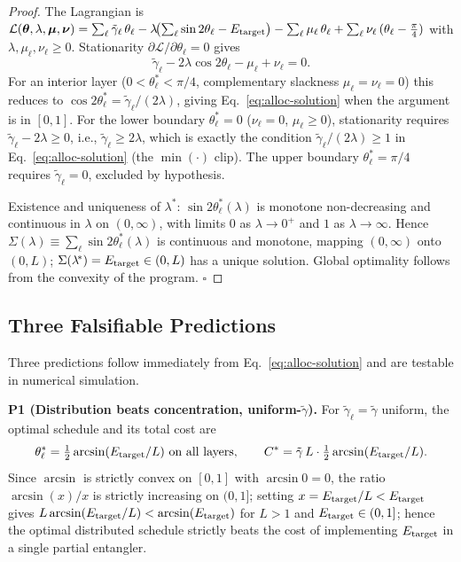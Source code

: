 \begin{proof}
The Lagrangian is
$\mathcal{L}(\boldsymbol\theta,\lambda,\boldsymbol\mu,\boldsymbol\nu)
= \sum_\ell \tilde\gamma_\ell\,\theta_\ell
- \lambda\!\bigl(\sum_\ell \sin 2\theta_\ell - E_{\rm target}\bigr)
- \sum_\ell \mu_\ell\,\theta_\ell
+ \sum_\ell \nu_\ell\,(\theta_\ell - \tfrac{\pi}{4})$
with $\lambda,\mu_\ell,\nu_\ell \geq 0$.
Stationarity $\partial\mathcal{L}/\partial\theta_\ell = 0$ gives
%
\begin{equation*}
\tilde\gamma_\ell - 2\lambda \cos 2\theta_\ell - \mu_\ell + \nu_\ell = 0.
\end{equation*}
%
For an interior layer ($0 < \theta_\ell^* < \pi/4$, complementary
slackness $\mu_\ell = \nu_\ell = 0$) this reduces to
$\cos 2\theta_\ell^* = \tilde\gamma_\ell/(2\lambda)$,
giving Eq.~\eqref{eq:alloc-solution} when the argument is in $[0,1]$.
For the lower boundary $\theta_\ell^* = 0$ ($\nu_\ell = 0$,
$\mu_\ell \geq 0$), stationarity requires
$\tilde\gamma_\ell - 2\lambda \geq 0$, i.e., $\tilde\gamma_\ell \geq 2\lambda$,
which is exactly the condition $\tilde\gamma_\ell/(2\lambda) \geq 1$
in Eq.~\eqref{eq:alloc-solution} (the $\min(\cdot)$ clip).
The upper boundary $\theta_\ell^* = \pi/4$ requires $\tilde\gamma_\ell = 0$,
excluded by hypothesis.

Existence and uniqueness of $\lambda^{\!*}$:
$\sin 2\theta_\ell^*(\lambda)$ is monotone non-decreasing and
continuous in $\lambda$ on $(0,\infty)$, with limits $0$ as $\lambda\to 0^+$
and $1$ as $\lambda\to\infty$.
Hence $\Sigma(\lambda) \equiv \sum_\ell \sin 2\theta_\ell^*(\lambda)$
is continuous and monotone, mapping $(0,\infty)$ onto $(0, L)$;
$\Sigma(\lambda^{\!*}) = E_{\rm target} \in (0,L)$ has a unique
solution.
Global optimality follows from the convexity of the program. $\square$
\end{proof}

\subsection{Three Falsifiable Predictions}
\label{subsec:predictions}

Three predictions follow immediately from Eq.~\eqref{eq:alloc-solution}
and are testable in numerical simulation.

\textbf{P1 (Distribution beats concentration, uniform-$\tilde\gamma$).}
For $\tilde\gamma_\ell = \tilde\gamma$ uniform, the optimal schedule
and its total cost are
\[
\theta_\ell^* = \tfrac{1}{2}\arcsin(E_{\rm target}/L)\ \text{on all layers},
\qquad
C^* = \tilde\gamma\,L\cdot \tfrac{1}{2}\arcsin(E_{\rm target}/L).
\]
Since $\arcsin$ is strictly convex on $[0,1]$ with $\arcsin 0 = 0$,
the ratio $\arcsin(x)/x$ is strictly increasing on $(0,1]$; setting
$x = E_{\rm target}/L < E_{\rm target}$ gives
$L \arcsin(E_{\rm target}/L) < \arcsin(E_{\rm target})$ for $L > 1$
and $E_{\rm target} \in (0,1]$;
hence the optimal distributed schedule strictly beats the cost of
implementing $E_{\rm target}$ in a single partial entangler.

